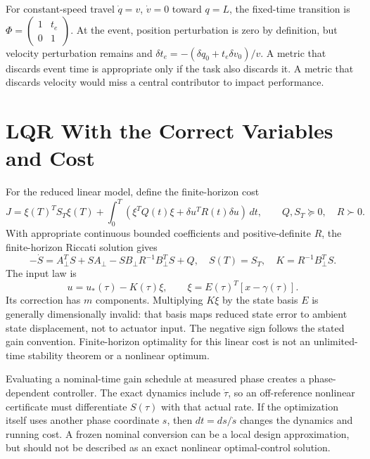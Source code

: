 For constant-speed travel $\dot q=v$, $\dot v=0$ toward $q=L$, the fixed-time
transition is $\Phi=\left(\begin{smallmatrix}1&t_e\\0&1\end{smallmatrix}\right)$.
At the event, position perturbation is zero by definition, but velocity
perturbation remains and
$\delta t_e=-(\delta q_0+t_e\delta v_0)/v$. A metric that discards event
time is appropriate only if the task also discards it. A metric that discards
velocity would miss a central contributor to impact performance.

\section{LQR With the Correct Variables and Cost}

For the reduced linear model, define the finite-horizon cost
\begin{equation}\label{eq:orbital_lqr_cost}
 J=\xi(T)^TS_T\xi(T)+\int_0^T
       (\xi^TQ(t)\xi+\delta u^TR(t)\delta u)\,dt,
 \qquad Q,S_T\succeq0,\quad R\succ0.
\end{equation}
With appropriate continuous bounded coefficients and positive-definite $R$,
the finite-horizon Riccati solution gives
\begin{equation}\label{eq:riccati}
 -\dot S=A_\perp^TS+SA_\perp-SB_\perp R^{-1}B_\perp^TS+Q,
 \quad S(T)=S_T,\quad K=R^{-1}B_\perp^TS.
\end{equation}
The input law is
\begin{equation}\label{eq:full_control_law}
 u=u_*(\tau)-K(\tau)\xi,\qquad
 \xi=E(\tau)^T[x-\gamma(\tau)].
\end{equation}
Its correction has $m$ components. Multiplying $K\xi$ by the state basis
$E$ is generally dimensionally invalid: that basis maps reduced state error
to ambient state displacement, not to actuator input. The negative sign
follows the stated gain convention. Finite-horizon optimality for this linear
cost is not an unlimited-time stability theorem or a nonlinear optimum.

Evaluating a nominal-time gain schedule at measured phase creates a
phase-dependent controller. The exact dynamics include $\dot\tau$, so an
off-reference nonlinear certificate must differentiate $S(\tau)$ with that
actual rate. If the optimization itself uses another phase coordinate $s$,
then $dt=ds/\dot s$ changes the dynamics and running cost. A frozen nominal
conversion can be a local design approximation, but should not be described
as an exact nonlinear optimal-control solution.

